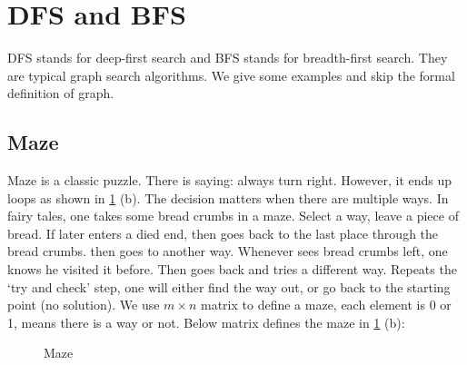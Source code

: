 \documentclass[b5paper]{article}
\begin{document}
\section{DFS and BFS}
 
\label{sec:DFS-BFS}

DFS stands for deep-first search and BFS stands for breadth-first search. They are typical graph search algorithms. We give some examples and skip the formal definition of graph.

\subsection{Maze}
Maze is a classic puzzle. There is saying: always turn right. However, it ends up loops as shown in \cref{fig:maze-loop} (b). The decision matters when there are multiple ways. In fairy tales, one takes some bread crumbs in a maze. Select a way, leave a piece of bread. If later enters a died end, then goes back to the last place through the bread crumbs. then goes to another way. Whenever sees bread crumbs left, one knows he visited it before. Then goes back and tries a different way. Repeats the `try and check' step, one will either find the way out, or go back to the starting point (no solution). We use $m \times n$ matrix to define a maze, each element is 0 or 1, means there is a way or not. Below matrix defines the maze in \cref{fig:maze-loop} (b):

\begin{figure}[htbp]
 \centering
 \caption{Maze}
 \label{fig:maze-loop}
\end{figure}
\end{document}
